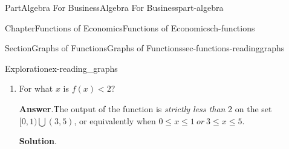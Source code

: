 \documentclass[oneside,10pt,]{tufte-book}
\newcommand{\blocktitlefont}{\relax}
\numberwithin{equation}{chapter}
\newcommand{\lt}{<}
\begin{document}
\begin{partptx}{Part}{Algebra For Business}{}{Algebra For Business}{}{}{part-algebra}
\begin{chapterptx}{Chapter}{Functions of Economics}{}{Functions of Economics}{}{}{ch-functions}
\begin{sectionptx}{Section}{Graphs of Functions}{}{Graphs of Functions}{}{}{sec-functions-readinggraphs}
\begin{exploration}{Exploration}{}{ex-reading_graphs}
\begin{enumerate}[font=\bfseries,label=(\alph*),ref=\alph*]
\par
Finally, solving \(f(x) = 0\) means finding the inputs \(x\) that have a height \(y\) of zero.  Looking at the graph, this happens only for \(x=4\).%
\item{}For what  \(x\) is \(f(x)\lt 2\)?%
\par\smallskip%
\noindent\textbf{\blocktitlefont Answer}.\hypertarget{ex-reading_graphs-4-2}{}\quad{}The output of the function is \emph{strictly less than} 2 on the set \([0,1)\bigcup(3,5)\), or equivalently when \(0\leq x\leq 1\ or\ 3\leq x\leq 5\).%
\par\smallskip%
\noindent\textbf{\blocktitlefont Solution}.\hypertarget{ex-reading_graphs-4-3}{}\quad{}\begin{image}{0.25}{0.5}{0.25}{}%
\end{image}
\end{enumerate}
\end{exploration}
\end{sectionptx}
\end{chapterptx}
\end{partptx}
\end{document}
